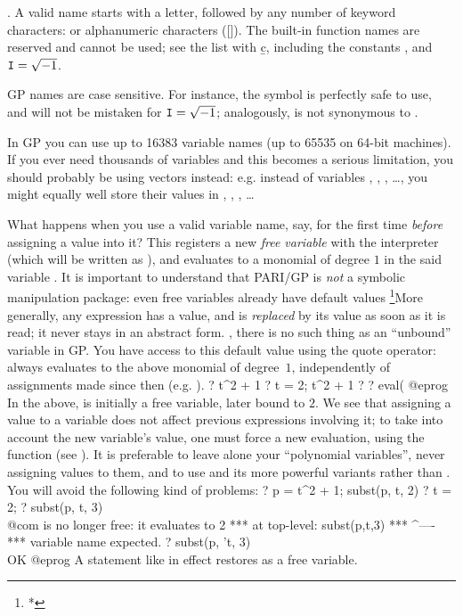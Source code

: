 \label{se:varname}. A valid name starts with a letter,
followed by any number of keyword characters: \kbd{\_} or alphanumeric
characters ([]). The built-in function names are reserved and
cannot be used; see the list with \b{c}, including the constants ,
 and ${\tt I}=\sqrt{-1}$.

GP names are case sensitive. For instance, the symbol  is perfectly
safe to use, and will not be mistaken for ${\tt I} = \sqrt{-1}$; analogously,
 is not synonymous to .

In GP you can use up to 16383 variable names (up to 65535 on 64-bit
machines). If you ever need thousands of variables and this becomes a serious
limitation, you should probably be using vectors instead: e.g. instead of
variables , , , \dots, you might equally well store
their values in , , , \dots

What happens when you use a valid variable name, say, for the first
time \emph{before} assigning a value into it? This registers a new
\emph{free variable} with the interpreter (which will be written as ),
and evaluates to a monomial of degree $1$ in the said variable . It is
important to understand that PARI/GP is \emph{not} a symbolic manipulation
package: even free variables already have default values%
\footnote{*}{More generally, any expression has a value, and is
\emph{replaced} by its value as soon as it is read; it never stays in an
abstract form.}%
, there is no such thing as an ``unbound'' variable in GP.
You have access to this default value using the quote operator: 
always evaluates to the above monomial of degree~$1$, independently of
assignments made since then (e.g. ).
%
\bprog
? t^2 + 1
? t = 2; t^2 + 1
? %
? eval(%
@eprog\noindent
In the above,  is initially a free variable, later bound to $2$. We
see that assigning a value to a variable does not affect previous expressions
involving it; to take into account the new variable's value, one must force a
new evaluation, using the function  (see ). It is
preferable to leave alone your ``polynomial variables'', never assigning
values to them, and to use  and its more powerful variants rather
than . You will avoid the following kind of problems:
\bprog
? p = t^2 + 1; subst(p, t, 2)
? t = 2;
? subst(p, t, 3)    \\@com {} is no longer free: it evaluates to 2
  ***   at top-level: subst(p,t,3)
  ***                         ^----
  ***   variable name expected.
? subst(p, 't, 3)   \\ OK
@eprog\noindent
A statement like  in effect restores  as a free variable.

